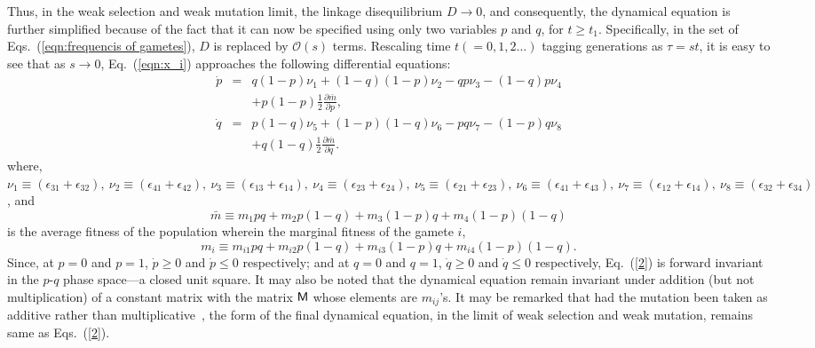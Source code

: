 \documentclass[
 pre,
 aps,
 a4paper,
 english,
 showkeys,
 reprint,
 twocolumn,
 superscriptaddress
]{revtex4}
\begin{document}
Thus, in the weak selection and weak mutation limit, the linkage disequilibrium $D \to 0$, and consequently, the dynamical equation is further simplified because of the fact that it can now be specified using only two variables $p$ and $q$, for $t \ge t_1$. Specifically, in the set of Eqs.~(\ref{eqn:frequencis of gametes}), $D$ is replaced by $\mathcal{O}(s)$ terms.
  Rescaling time $t (=0,1,2...)$ tagging generations as $\tau=st$, it is easy to see that as $s \to 0$, Eq.~(\ref{eqn:x_i}) approaches the following differential equations:
 \begin{subequations}\label{2}
 	\begin{eqnarray}
 		\dot{p}&=&{q}{(1-p)} \nu_1+{(1-q)}{(1-p)} \nu_2-{q}{p}\nu_3-{(1-q)}{p}\nu_4\nonumber\\ && +p(1-p)\frac{1}{2}\frac{\partial \bar{m}}{\partial p},\\
 		\dot{q}&=&{p}{(1-q)} \nu_5+{(1-p)}{(1-q)} \nu_6-{p}{q}\nu_7-{(1-p)}{q}\nu_8  \nonumber \\&&+q(1-q)\frac{1}{2}\frac{\partial \bar{m}}{\partial q}.
 	\end{eqnarray}
 \end{subequations}
where, $\nu_1\equiv{(\epsilon_{31}+\epsilon_{32})},~ \nu_2\equiv{(\epsilon_{41}+\epsilon_{42})},~ \nu_3\equiv{(\epsilon_{13}+\epsilon_{14})},~ \nu_4\equiv{(\epsilon_{23}+\epsilon_{24})},~
 \nu_5\equiv{(\epsilon_{21}+\epsilon_{23})},~ \nu_6\equiv{(\epsilon_{41}+\epsilon_{43})},~ \nu_7\equiv{(\epsilon_{12}+\epsilon_{14})},~ \nu_8\equiv{(\epsilon_{32}+\epsilon_{34})}$, and
 \begin{equation}
 \bar{m}\equiv m_1pq+m_2p(1-q)+m_3(1-p)q+m_4 (1-p)(1-q)
 \end{equation}
 is the average fitness of the population wherein the marginal fitness of the gamete $i$,
 \begin{equation}
 m_i\equiv m_{i1}pq+m_{i2}p(1-q)+m_{i3}(1-p)q+m_{i4} (1-p)(1-q).
 \end{equation}
{\color{black}Since, at $p=0$ and $p=1$,} $\dot{p}\ge 0$ and $\dot{p} \le 0$ respectively; and at $q=0$ and $q=1$,  $\dot{q}\ge 0$ and $\dot{q} \le 0$ respectively, Eq.~(\ref{2}) is forward invariant in the $p$-$q$ phase space---a closed unit square. It may also be noted that the dynamical equation remain invariant under addition (but not multiplication) of a constant matrix with the matrix ${\sf M}$ whose elements are $m_{ij}$'s. It may be remarked that had the mutation been taken as additive rather than multiplicative~\cite{Mobilia2010jtb,toupo2015PRE}, the form of the final dynamical equation, in the limit of weak selection and weak mutation, remains same as Eqs.~(\ref{2}).
 
\end{document}
